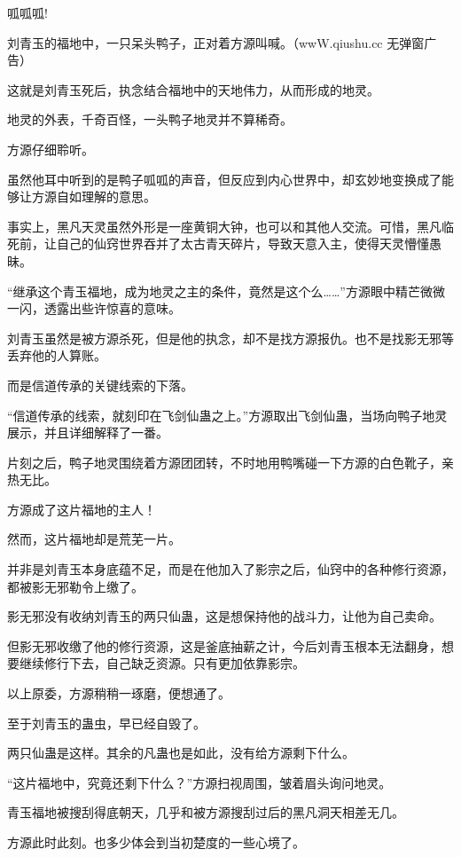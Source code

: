 
\begin{this_body}

呱呱呱!

刘青玉的福地中，一只呆头鸭子，正对着方源叫喊。（wwW.qiushu.cc 无弹窗广告）

这就是刘青玉死后，执念结合福地中的天地伟力，从而形成的地灵。

地灵的外表，千奇百怪，一头鸭子地灵并不算稀奇。

方源仔细聆听。

虽然他耳中听到的是鸭子呱呱的声音，但反应到内心世界中，却玄妙地变换成了能够让方源自如理解的意思。

事实上，黑凡天灵虽然外形是一座黄铜大钟，也可以和其他人交流。可惜，黑凡临死前，让自己的仙窍世界吞并了太古青天碎片，导致天意入主，使得天灵懵懂愚昧。

“继承这个青玉福地，成为地灵之主的条件，竟然是这个么……”方源眼中精芒微微一闪，透露出些许惊喜的意味。

刘青玉虽然是被方源杀死，但是他的执念，却不是找方源报仇。也不是找影无邪等丢弃他的人算账。

而是信道传承的关键线索的下落。

“信道传承的线索，就刻印在飞剑仙蛊之上。”方源取出飞剑仙蛊，当场向鸭子地灵展示，并且详细解释了一番。

片刻之后，鸭子地灵围绕着方源团团转，不时地用鸭嘴碰一下方源的白色靴子，亲热无比。

方源成了这片福地的主人！

然而，这片福地却是荒芜一片。

并非是刘青玉本身底蕴不足，而是在他加入了影宗之后，仙窍中的各种修行资源，都被影无邪勒令上缴了。

影无邪没有收纳刘青玉的两只仙蛊，这是想保持他的战斗力，让他为自己卖命。

但影无邪收缴了他的修行资源，这是釜底抽薪之计，今后刘青玉根本无法翻身，想要继续修行下去，自己缺乏资源。只有更加依靠影宗。

以上原委，方源稍稍一琢磨，便想通了。

至于刘青玉的蛊虫，早已经自毁了。

两只仙蛊是这样。其余的凡蛊也是如此，没有给方源剩下什么。

“这片福地中，究竟还剩下什么？”方源扫视周围，皱着眉头询问地灵。

青玉福地被搜刮得底朝天，几乎和被方源搜刮过后的黑凡洞天相差无几。

方源此时此刻。也多少体会到当初楚度的一些心境了。


\end{this_body}
